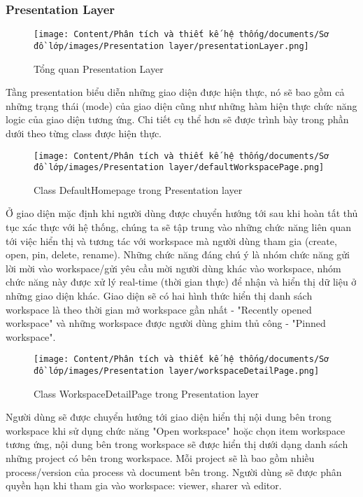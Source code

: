 \subsubsection{Presentation Layer}
\begin{figure}[H]
    \centering
    \texttt{[image: Content/Phân tích và thiết kế hệ thống/documents/Sơ đồ lớp/images/Presentation layer/presentationLayer.png]}
    \vspace{0.5cm}
    \caption{Tổng quan Presentation Layer}
    \label{fig:Tổng quan Presentation layer}
\end{figure}
Tầng presentation biểu diễn những giao diện được hiện thực, nó sẽ bao gồm cả những trạng thái (mode) của giao diện cũng như những hàm hiện thực chức năng logic của giao diện tương ứng.
Chi tiết cụ thể hơn sẽ được trình bày trong phần dưới theo từng class được hiện thực.

\begin{figure}[H]
    \centering
    \texttt{[image: Content/Phân tích và thiết kế hệ thống/documents/Sơ đồ lớp/images/Presentation layer/defaultWorkspacePage.png]}
    \vspace{0.5cm}
    \caption{Class DefaultHomepage trong Presentation layer}
    \label{fig:Class Default homepage trong Presentation layer}
\end{figure}
Ở giao diện mặc định khi người dùng được chuyển hướng tới sau khi hoàn tất thủ tục xác thực với hệ thống, chúng ta sẽ tập trung vào những chức năng liên quan tới việc hiển thị và tương tác với workspace mà người dùng tham gia (create, open, pin, delete, rename). Những chức năng đáng chú ý là nhóm chức năng gửi lời mời vào workspace/gửi yêu cầu mời người dùng khác vào workspace, nhóm chức năng này được xử lý real-time (thời gian thực) để nhận và hiển thị dữ liệu ở những giao diện khác. Giao diện sẽ có hai hình thức hiển thị danh sách workspace là theo thời gian mở workspace gần nhất - "Recently opened workspace" và những workspace được người dùng ghim thủ công - "Pinned workspace".

\begin{figure}[H]
    \centering
    \texttt{[image: Content/Phân tích và thiết kế hệ thống/documents/Sơ đồ lớp/images/Presentation layer/workspaceDetailPage.png]}
    \vspace{0.5cm}
    \caption{Class WorkspaceDetailPage trong Presentation layer}
    \label{fig:Class WorkspaceDetailPage trong Presentation layer}
\end{figure}
Người dùng sẽ được chuyển hướng tới giao diện hiển thị nội dung bên trong workspace khi sử dụng chức năng "Open workspace" hoặc chọn item workspace tương ứng, nội dung bên trong workspace sẽ được hiển thị dưới dạng danh sách những project có bên trong workspace. Mỗi project sẽ là bao gồm nhiều process/version của process và document bên trong. Người dùng sẽ được phân quyền hạn khi tham gia vào workspace: viewer, sharer và editor.

